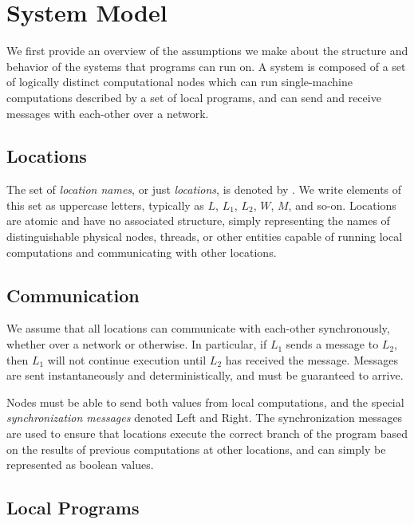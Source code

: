 \section{System Model}
\label{sec:system_model}
We first provide an overview of the assumptions we make about the structure and behavior of the systems that \langname{} programs can run on.
A system is composed of a set of logically distinct computational nodes which can run single-machine computations described by a set of local programs, and can send and receive messages with each-other over a network.

\subsection{Locations}
\label{sec:locations}
The set of \emph{location names}, or just \emph{locations}, is denoted by \Locations.
We write elements of this set as uppercase letters, typically as $L$, $L_1$, $L_2$, $W$, $M$, and so-on.
Locations are atomic and have no associated structure, simply representing the names of distinguishable physical nodes, threads, or other entities capable of running local computations and communicating with other locations.

\subsection{Communication}
\label{sec:communication}
We assume that all locations can communicate with each-other synchronously, whether over a network or otherwise.
In particular, if $L_1$ sends a message to $L_2$, then $L_1$ will not continue execution until $L_2$ has received the message.
Messages are sent instantaneously and deterministically, and must be guaranteed to arrive.

Nodes must be able to send both values from local computations, and the special \emph{synchronization messages} denoted \textsf{Left} and \textsf{Right}.
The synchronization messages are used to ensure that locations execute the correct branch of the program based on the results of previous computations at other locations, and can simply be represented as boolean values.

\subsection{Local Programs}
\label{sec:local-programs}

